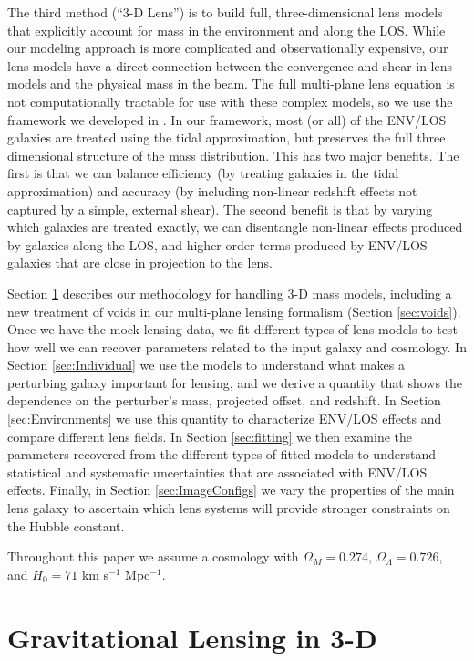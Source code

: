 \documentclass{emulateapj}
\begin{document}
The third method (``3-D Lens'') is to build full, three-dimensional lens models that explicitly account for mass in the environment and along the LOS. While our modeling approach is more complicated and observationally expensive, our lens models have a direct connection between the convergence and shear in lens models and the physical mass in the beam. The full multi-plane lens equation is not computationally tractable for use with these complex models, so we use the framework we developed in \citet[hereafter M14]{McCully14}. In our framework, most (or all) of the ENV/LOS galaxies are treated using the tidal approximation, but preserves the full three dimensional structure of the mass distribution. This has two major benefits. The first is that we can balance efficiency (by treating galaxies in the tidal approximation) and accuracy (by including non-linear redshift effects not captured by a simple, external shear). The second benefit is that by varying which galaxies are treated exactly, we can disentangle non-linear effects produced by galaxies along the LOS, and higher order terms produced by ENV/LOS galaxies that are close in projection to the lens.

 Section \ref{sec:3DMassModels} describes our methodology for handling 3-D mass models, including a new treatment of voids in our multi-plane lensing formalism (Section \ref{sec:voids}). Once we have the mock lensing data, we fit different types of lens models to test how well we can recover parameters related to the input galaxy and cosmology.  In Section \ref{sec:Individual} we use the models to understand what makes a perturbing galaxy important for lensing, and we derive a quantity that shows the dependence on the perturber's mass, projected offset, and redshift. In Section \ref{sec:Environments} we use this quantity to characterize ENV/LOS effects and compare different lens fields. In Section \ref{sec:fitting} we then examine the parameters recovered from the different types of fitted models to understand statistical and systematic uncertainties that are associated with ENV/LOS effects. Finally, in Section \ref{sec:ImageConfigs} we vary the properties of the main lens galaxy to ascertain which lens systems will provide stronger constraints on the Hubble constant.

Throughout this paper we assume a cosmology with $\Omega_M = 0.274$, $\Omega_\Lambda = 0.726$, and $H_0 = 71$ km s$^{-1}$ Mpc$^{-1}$.


\section{Gravitational Lensing in 3-D}
\label{sec:3DMassModels}
\end{document}
